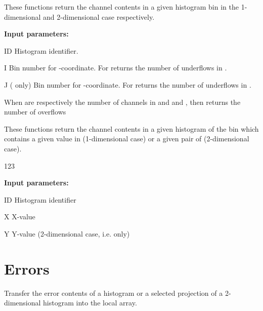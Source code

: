  
\Action
These functions return the channel contents in a given histogram bin
in the 1-dimensional and 2-dimensional case respectively.
 
\begin{DLtt}{12}
\item[{\rm\bf Input parameters:}]
\item[ID] Histogram identifier.
\item[I] Bin number for -coordinate. For 
          returns the number of underflows in .
\item[J] ( only) Bin number for -coordinate.
         For  
          returns the number of underflows in .
\end{DLtt}
 
When  are respectively the number of channels in  and
 and
, then  returns the number of overflows
 
 
\Action
These functions return the channel contents in a given histogram of the bin
which contains a given value in  (1-dimensional case) or
a given pair of  (2-dimensional case).
 
\begin{DLtt}{123}
\item[{\rm\bf Input parameters:}]
\item[ID] Histogram identifier
\item[X] X-value
\item[Y] Y-value (2-dimensional case, i.e.  only)
\end{DLtt}

\finalnewpage
 
\section{Errors}
\label{HERRORS} 

 
\Action
Transfer the error contents of a histogram or a selected projection of
a 2-dimensional histogram into the local array.
 
